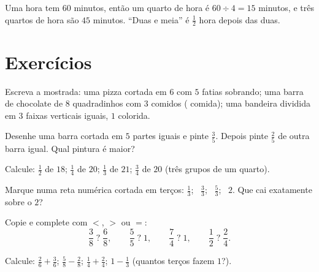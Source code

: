 \begin{example}\label{ex:g4:fractions:hour}
Uma hora tem $60$ minutos, então um quarto de hora é
$60 \div 4 = 15$ minutos, e três quartos de hora são $45$ minutos.
``Duas e meia'' é $\frac12$ hora depois das duas.
\end{example}

\section{Exercícios}

\begin{exercise}[$\star$]\label{exo:g4:fractions:1}
Escreva a  mostrada: uma pizza cortada em $6$ com $5$ fatias
sobrando; uma barra de chocolate de $8$ quadradinhos com $3$ comidos
( comida); uma bandeira dividida em $3$ faixas verticais
iguais, $1$ colorida.
\end{exercise}

\begin{exercise}[$\star$]\label{exo:g4:fractions:2}
Desenhe uma barra cortada em $5$ partes iguais e pinte $\frac35$.
Depois pinte $\frac{2}{5}$ de outra barra igual. Qual pintura é
maior?
\end{exercise}

\begin{exercise}[$\star$]\label{exo:g4:fractions:3}
Calcule: $\frac12$ de $18$; \quad $\frac14$ de $20$; \quad
$\frac13$ de $21$; \quad $\frac34$ de $20$ (três grupos de um
quarto).
\end{exercise}

\begin{exercise}[$\star$]\label{exo:g4:fractions:4}
Marque numa reta numérica cortada em terços: $\frac13$; \
$\frac33$; \ $\frac53$; \ $2$. Que  cai exatamente sobre o
$2$?
\end{exercise}

\begin{exercise}[$\star$]\label{exo:g4:fractions:5}
Copie e complete com $<$, $>$ ou $=$:
\[
\frac38 \;?\; \frac68, \qquad
\frac55 \;?\; 1, \qquad
\frac74 \;?\; 1, \qquad
\frac12 \;?\; \frac24 .
\]
\end{exercise}

\begin{exercise}[$\star$]\label{exo:g4:fractions:6}
Calcule: $\frac26 + \frac36$; \quad $\frac58 - \frac28$; \quad
$\frac14 + \frac24$; \quad $1 - \frac13$ (quantos terços fazem
$1$?).
\end{exercise}

